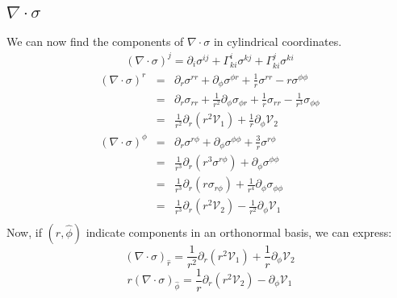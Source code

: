 \documentclass{article}
\begin{document}
\subsection{$\nabla \cdot \sigma$}
We can now find the components of $\nabla \cdot \sigma$ in cylindrical coordinates.
\begin{eqnarray*}
  (\nabla \cdot \sigma)^{j} = \partial_{i} \sigma^{i j} + \Gamma^{i}_{k i}\sigma^{k j}+\Gamma^{j}_{k i}\sigma^{k i} 
\end{eqnarray*}
\begin{eqnarray*}
  (\nabla \cdot \sigma)^r &=&  \partial_{r} \sigma^{r r} + \partial_{\phi} \sigma^{\phi r}+ \frac{1}{r}\sigma^{r r} -r \sigma^{\phi \phi}\\
                          &=& \partial_{r} \sigma_{r r} + \frac{1}{r^2} \partial_{\phi} \sigma_{\phi r}+ \frac{1}{r}\sigma_{r r} - \frac{1}{r^3} \sigma_{\phi \phi}\\
                          &=& \frac{1}{r^2}\partial_{r}(r^2 \mathcal{V}_1) + \frac{1}{r} \partial_{\phi} \mathcal{V}_2\\
   (\nabla \cdot \sigma)^{\phi} &=&  \partial_{r} \sigma^{r \phi} +\partial_{\phi} \sigma^{\phi \phi} + \frac{3}{r}\sigma^{r\phi}\\
                                &=& \frac{1}{r^3}\partial_{r}(r^3 \sigma^{r \phi}) +\partial_{\phi} \sigma^{\phi \phi} \\
                                &=& \frac{1}{r^3}\partial_{r}(r \sigma_{r \phi}) +\frac{1}{r^4}\partial_{\phi} \sigma_{\phi \phi} \\
                                &=& \frac{1}{r^3}\partial_{r}(r^2 \mathcal{V}_2) -\frac{1}{r^2}\partial_{\phi} \mathcal{V}_1 \\
\end{eqnarray*}
Now, if $(\hat{r},\hat{\phi})$ indicate components in an orthonormal basis, we can express:
\begin{equation}
  \boxed{(\nabla \cdot \sigma)_{\hat{r}} = \frac{1}{r^2}\partial_{r}(r^2 \mathcal{V}_1) + \frac{1}{r} \partial_{\phi} \mathcal{V}_2}
\end{equation}
\begin{equation}
  \boxed{ r (\nabla \cdot \sigma)_{\hat{\phi}} =  \frac{1}{r}\partial_{r}(r^2 \mathcal{V}_2) -\partial_{\phi} \mathcal{V}_1 }
\end{equation}
\end{document}
